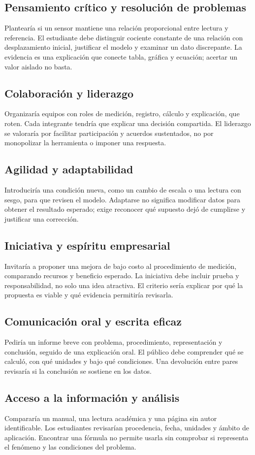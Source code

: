 \documentclass[spanish,letterpaper,oneside]{article}
\begin{document}
\subsection{Pensamiento crítico y resolución de problemas}
Plantearía si un sensor mantiene una relación proporcional entre lectura y referencia. El estudiante debe distinguir cociente constante de una relación con desplazamiento inicial, justificar el modelo y examinar un dato discrepante. La evidencia es una explicación que conecte tabla, gráfica y ecuación; acertar un valor aislado no basta.
\subsection{Colaboración y liderazgo}
Organizaría equipos con roles de medición, registro, cálculo y explicación, que roten. Cada integrante tendría que explicar una decisión compartida. El liderazgo se valoraría por facilitar participación y acuerdos sustentados, no por monopolizar la herramienta o imponer una respuesta.
\subsection{Agilidad y adaptabilidad}
Introduciría una condición nueva, como un cambio de escala o una lectura con sesgo, para que revisen el modelo. Adaptarse no significa modificar datos para obtener el resultado esperado; exige reconocer qué supuesto dejó de cumplirse y justificar una corrección.
\subsection{Iniciativa y espíritu empresarial}
Invitaría a proponer una mejora de bajo costo al procedimiento de medición, comparando recursos y beneficio esperado. La iniciativa debe incluir prueba y responsabilidad, no solo una idea atractiva. El criterio sería explicar por qué la propuesta es viable y qué evidencia permitiría revisarla.
\subsection{Comunicación oral y escrita eficaz}
Pediría un informe breve con problema, procedimiento, representación y conclusión, seguido de una explicación oral. El público debe comprender qué se calculó, con qué unidades y bajo qué condiciones. Una devolución entre pares revisaría si la conclusión se sostiene en los datos.
\subsection{Acceso a la información y análisis}
Compararía un manual, una lectura académica y una página sin autor identificable. Los estudiantes revisarían procedencia, fecha, unidades y ámbito de aplicación. Encontrar una fórmula no permite usarla sin comprobar si representa el fenómeno y las condiciones del problema.
\end{document}
